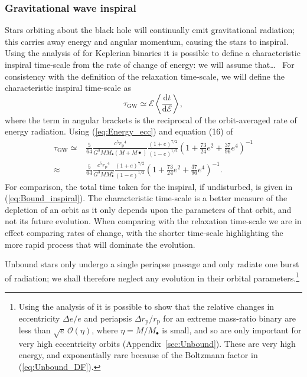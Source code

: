 \documentclass[useAMS,usedcolumn,usegraphicx,usenatbib]{mn2e}
\newcommand{\eqnref}[1]{(\ref{eq:#1})}
\newcommand{\apref}[1]{Appendix~\ref{sec:#1}}
\newcommand{\sub}[1]{\ensuremath{_\mathrm{#1}}}
\newcommand{\dd}{\ensuremath{\mathrm{d}}}
\newcommand{\diff}[2]{\ensuremath{\frac{\dd {#1}}{\dd {#2}}}}
\newcommand{\order}[1]{\ensuremath{\mathcal{O}({#1})}}
\begin{document}
\subsubsection{Gravitational wave inspiral}

Stars orbiting about the black hole will continually emit gravitational radiation; this carries away energy and angular momentum, causing the stars to inspiral. Using the analysis of \citet{Peters1963,Peters1964} for Keplerian binaries it is possible to define a characteristic inspiral time-scale from the rate of change of energy: we will assume that\ldots~\citep{Hopman2005} For consistency with the definition of the relaxation time-scale, we will define the characteristic inspiral time-scale as~\citep{MiraldaEscude2000}
\begin{equation}
\tau\sub{GW} \simeq \mathcal{E}\left\langle\diff{t}{\mathcal{E}}\right\rangle,
\label{eq:tGW-def}
\end{equation}
where the term in angular brackets is the reciprocal of the orbit-averaged rate of energy radiation. Using \eqnref{Energy_ecc} and equation (16) of \citet{Peters1963}
\begin{align}
\tau\sub{GW} \simeq {} & \frac{5}{64}\frac{c^5r\sub{p}^4}{G^3MM_\bullet\left(M + M\bullet\right)}\frac{(1+e)^{7/2}}{(1-e)^{1/2}}\left(1+\frac{73}{24}e^2 + \frac{37}{96}e^4\right)^{-1} \\
 \approx {} & \frac{5}{64}\frac{c^5r\sub{p}^4}{G^3MM_\bullet^2}\frac{(1+e)^{7/2}}{(1-e)^{1/2}}\left(1+\frac{73}{24}e^2 + \frac{37}{96}e^4\right)^{-1}.
\end{align}
For comparison, the total time taken for the inspiral, if undisturbed, is given in \eqnref{Bound_inspiral}. The characteristic time-scale is a better measure of the depletion of an orbit as it only depends upon the parameters of that orbit, and not its future evolution. When comparing with the relaxation time-scale we are in effect comparing rates of change, with the shorter time-scale highlighting the more rapid process that will dominate the evolution.

Unbound stars only undergo a single periapse passage and only radiate one burst of radiation; we shall therefore neglect any evolution in their orbital parameters.\footnote{Using the analysis of \citet{Turner1977} it is possible to show that the relative changes in eccentricity $\Delta e / e$ and periapsis $\Delta r\sub{p} / r\sub{p}$ for an extreme mass-ratio binary are less than $\sqrt{e}\,\order{\eta}$, where $\eta = M/M_\bullet$ is small, and so are only important for very high eccentricity orbits (\apref{Unbound}). These are very high energy, and exponentially rare because of the Boltzmann factor in \eqnref{Unbound_DF}.}
\end{document}
